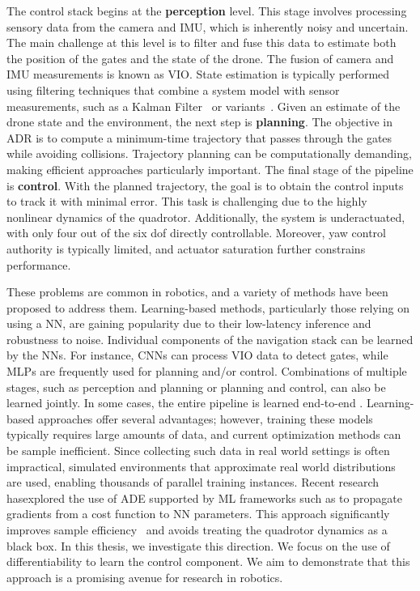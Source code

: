 The control stack begins at the \textbf{perception} level.
This stage involves processing sensory data from the camera and IMU, which is inherently noisy and uncertain.
The main challenge at this level is to filter and fuse this data to estimate both the position of the gates and the state of the drone.
The fusion of camera and IMU measurements is known as \ac{VIO}.
State estimation is typically performed using filtering techniques that combine a system model with sensor measurements, such as a Kalman Filter~\cite{kalman} or variants~\cite{wan_unscented_2000}.
Given an estimate of the drone state and the environment, the next step is \textbf{planning}.
The objective in \ac{ADR} is to compute a minimum-time trajectory that passes through the gates while avoiding collisions.
Trajectory planning can be computationally demanding, making efficient approaches particularly important.
The final stage of the pipeline is \textbf{control}.
With the planned trajectory, the goal is to obtain the control inputs to track it with minimal error.
This task is challenging due to the highly nonlinear dynamics of the quadrotor.
Additionally, the system is underactuated, with only four out of the six \ac{dof} directly controllable.
Moreover, yaw control authority is typically limited, and actuator saturation further constrains performance.

These problems are common in robotics, and a variety of methods have been proposed to address them.
Learning-based methods, particularly those relying on using a \ac{NN}, are gaining popularity due to their low-latency inference and robustness to noise.
Individual components of the navigation stack can be learned by the \ac{NN}s.
For instance, \ac{CNN}s can process \ac{VIO} data to detect gates, while \ac{MLP}s  are frequently used for planning and/or control.
Combinations of multiple stages, such as perception and planning or planning and control, can also be learned jointly.
In some cases, the entire pipeline is learned end-to-end \cite{hanover_autonomous_2024}.
Learning-based approaches offer several advantages; however, training these models typically requires large amounts of data, and current optimization methods can be sample inefficient.
Since collecting such data in real world settings is often impractical, simulated environments that approximate real world distributions are used, enabling thousands of parallel training instances.
Recent research hasexplored the use of \ac{ADE} supported by \ac{ML} frameworks such as \cite{paszke_pytorch_2019,jax2018github,abadi_tensorflow_2016} to propagate gradients from a cost function to \ac{NN} parameters.
This approach significantly improves sample efficiency~\cite{zhang_back_2025} and avoids treating the quadrotor dynamics as a black box.
In this thesis, we investigate this direction. We focus on the use of differentiability to learn the control component.
We aim to demonstrate that this approach is a promising avenue for research in robotics.

